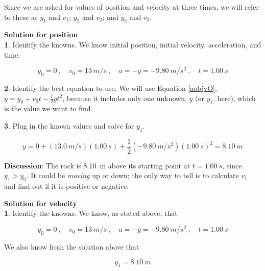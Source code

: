 \documentclass[../../main-ap-physics.tex]{subfiles}
\begin{document}
\vspace{1em}

Since we are asked for values of position and velocity at three times, we will refer to these as $y_1$ and $v_1$; $y_2$ and $v_2$; and $y_3$ and $v_3$.

\vspace{1em}

\textbf{Solution for position}\\
\textbf{1}. Identify the knowns. We know initial position, initial velocity, acceleration, and time:

\begin{equation*}
    y_0 = 0 \ , \quad
    v_0 = \SI{13}{m/s}  \ , \quad
    a = -g = -\SI{9.80}{m/s^2}  \ , \quad
    t = \SI{1.00}{s}
\end{equation*}

\textbf{2}. Identify the best equation to use. We will use Equation \eqref{aobjvO}, $y = y_0 + v_0 t - \frac{1}{2} g t^2$, because it includes only one unknown, $y$ (or $y_1$, here), which is the value we want to find.

\vspace{1em}

\textbf{3}. Plug in the known values and solve for $y_1$.

\begin{equation*}
    y = 0 + \left(\SI{13.0}{m/s}\right) \left(\SI{1.00}{s}\right)
        + \frac{1}{2} \left(-\SI{9.80}{m/s^2}\right) \left(\SI{1.00}{s}\right)^2
        = \SI{8.10}{m}
\end{equation*}

\textbf{Discussion}: The rock is \SI{8.10}{m} above its starting point at $t = \SI{1.00}{s}$, since $y_1 > y_0$. It could be \textit{moving} up or down; the only way to tell is to calculate $v_1$ and find out if it is positive or negative.

\vspace{1em}

\textbf{Solution for velocity}\\
\textbf{1}. Identify the knowns. We know, as stated above, that 

\begin{equation*}
    y_0 = 0 \ , \quad
    v_0 = \SI{13}{m/s}  \ , \quad
    a = -g = -\SI{9.80}{m/s^2}  \ , \quad
    t = \SI{1.00}{s}
\end{equation*}

We also know from the solution above that 

\begin{equation*}
    y_1 = \SI{8.10}{m}
\end{equation*}
\end{document}

